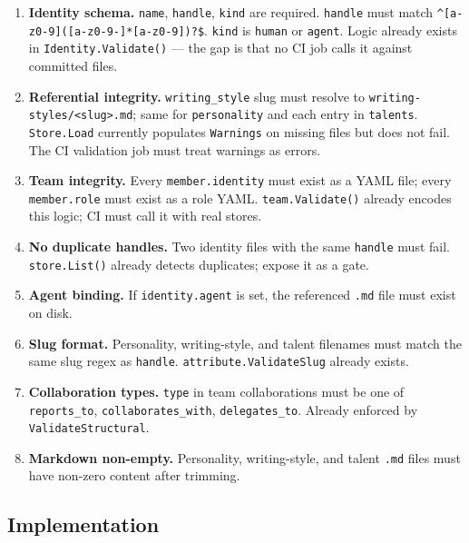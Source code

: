 \documentclass[a4paper,10pt]{article}
\newcommand{\pkg}[1]{\texttt{#1}}
\newcommand{\field}[1]{\texttt{#1}}
\newcommand{\fpath}[1]{\texttt{#1}}
\begin{document}
\begin{enumerate}
  \item \textbf{Identity schema.}  \field{name}, \field{handle},
    \field{kind} are required.  \field{handle} must match
    \texttt{\^{}[a-z0-9]([a-z0-9-]*[a-z0-9])?\$}.  \field{kind} is
    \texttt{human} or \texttt{agent}.  Logic already exists in
    \pkg{Identity.Validate()} --- the gap is that no CI job calls it
    against committed files.

  \item \textbf{Referential integrity.}  \field{writing\_style} slug
    must resolve to \fpath{writing-styles/<slug>.md}; same for
    \field{personality} and each entry in \field{talents}.
    \pkg{Store.Load} currently populates \texttt{Warnings} on missing
    files but does not fail.  The CI validation job must treat
    warnings as errors.

  \item \textbf{Team integrity.}  Every \field{member.identity} must
    exist as a YAML file; every \field{member.role} must exist as a
    role YAML.  \pkg{team.Validate()} already encodes this logic; CI
    must call it with real stores.

  \item \textbf{No duplicate handles.}  Two identity files with the
    same \field{handle} must fail.  \pkg{store.List()} already detects
    duplicates; expose it as a gate.

  \item \textbf{Agent binding.}  If \field{identity.agent} is set,
    the referenced \texttt{.md} file must exist on disk.

  \item \textbf{Slug format.}  Personality, writing-style, and talent
    filenames must match the same slug regex as \field{handle}.
    \pkg{attribute.ValidateSlug} already exists.

  \item \textbf{Collaboration types.}  \field{type} in team
    collaborations must be one of \texttt{reports\_to},
    \texttt{collaborates\_with}, \texttt{delegates\_to}.  Already
    enforced by \pkg{ValidateStructural}.

  \item \textbf{Markdown non-empty.}  Personality, writing-style, and
    talent \texttt{.md} files must have non-zero content after
    trimming.
\end{enumerate}

\subsection*{Implementation}
\end{document}
